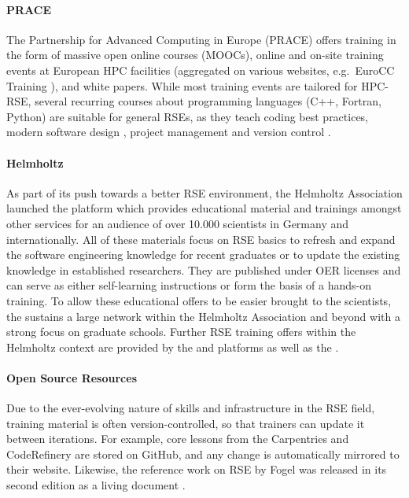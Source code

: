 \documentclass[a4paper
]{article}
\begin{document}
\hypertarget{prace}{%
\paragraph{PRACE}\label{prace}}

The Partnership for Advanced Computing in Europe (PRACE)
\autocite{PRACE} offers training in the form of massive open online
courses (MOOCs), online and on-site training events at European HPC
facilities (aggregated on various websites, e.g.~EuroCC Training
\autocite{EuroCCTraining}), and white papers. While most training events
are tailored for HPC-RSE, several recurring courses about programming
languages (C++, Fortran, Python) are suitable for general RSEs, as they
teach coding best practices, modern software design
\autocite{LRZModernCpp}, project management and version control
\autocite{LRZIntroCpp}.

\hypertarget{helmholtz}{%
\paragraph{Helmholtz}\label{helmholtz}}

As part of its push towards a better RSE environment, the Helmholtz
Association launched the \autocite{HIFIS} platform which provides
educational material and trainings amongst other services for an
audience of over 10.000 scientists in Germany and internationally. All
of these materials focus on RSE basics to refresh and expand the
software engineering knowledge for recent graduates or to update the
existing knowledge in established researchers. They are published under
OER licenses and can serve as either self-learning instructions or form
the basis of a hands-on training. To allow these educational offers to
be easier brought to the scientists, the \autocite{HIDA} sustains a
large network within the Helmholtz Association and beyond with a strong
focus on graduate schools. Further RSE training offers within the
Helmholtz context are provided by the \autocite{HAI} and
\autocite{HImaging} platforms as well as the \autocite{HMC}.

\hypertarget{open-source-resources}{%
\paragraph{Open Source Resources}\label{open-source-resources}}

Due to the ever-evolving nature of skills and infrastructure in the RSE
field, training material is often version-controlled, so that trainers
can update it between iterations. For example, core lessons from the
Carpentries and CodeRefinery are stored on GitHub, and any change is
automatically mirrored to their website. Likewise, the reference work on
RSE by Fogel \autocite{Fogel2005} was released in its second edition as
a living document \autocite{Fogel2017}.
\end{document}
